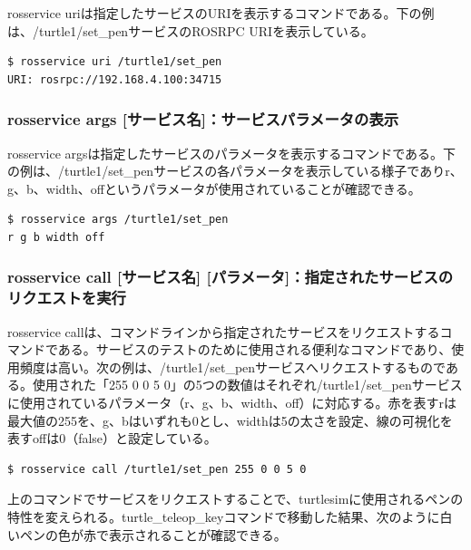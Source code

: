 rosservice uriは指定したサービスのURIを表示するコマンドである。下の例は、/turtle1/set\_penサービスのROSRPC URIを表示している。

\begin{lstlisting}[language=ROS]
$ rosservice uri /turtle1/set_pen
URI: rosrpc://192.168.4.100:34715
\end{lstlisting}

\subsubsection{rosservice args [サービス名]：サービスパラメータの表示}

rosservice argsは指定したサービスのパラメータを表示するコマンドである。下の例は、/turtle1/set\_penサービスの各パラメータを表示している様子でありr、g、b、width、offというパラメータが使用されていることが確認できる。

\begin{lstlisting}[language=ROS]
$ rosservice args /turtle1/set_pen
r g b width off
\end{lstlisting}

\subsubsection{rosservice call [サービス名] [パラメータ]：指定されたサービスのリクエストを実行}

rosservice callは、コマンドラインから指定されたサービスをリクエストするコマンドである。サービスのテストのために使用される便利なコマンドであり、使用頻度は高い。次の例は、/turtle1/set\_penサービスへリクエストするものである。使用された「255 0 0 5 0」の5つの数値はそれぞれ/turtle1/set\_penサービスに使用されているパラメータ（r、g、b、width、off）に対応する。赤を表すrは最大値の255を、g、bはいずれも0とし、widthは5の太さを設定、線の可視化を表すoffは0（false）と設定している。

\begin{lstlisting}[language=ROS]
$ rosservice call /turtle1/set_pen 255 0 0 5 0
\end{lstlisting}

上のコマンドでサービスをリクエストすることで、turtlesimに使用されるペンの特性を変えられる。turtle\_teleop\_keyコマンドで移動した結果、次のように白いペンの色が赤で表示されることが確認できる。


